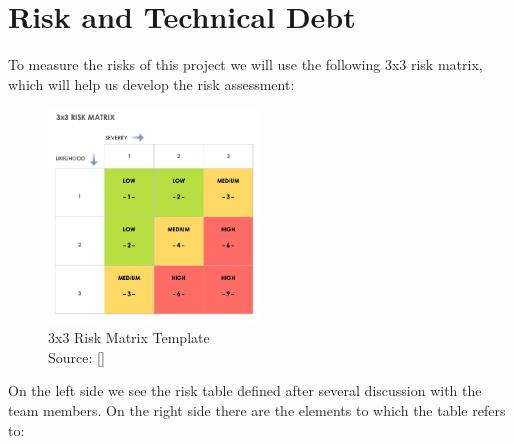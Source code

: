 \section{Risk and Technical Debt}

To measure the risks of this project we will use the following 3x3 risk matrix, which will help us develop the 
\gls{risk assessment}:

\begin{figure}[H]
    \centering
    \includegraphics[width=0.5\textwidth]{assets/Risk-Matrix.png}
    \caption{3x3 Risk Matrix Template\\ Source: [\citet{refonline:smtrisk}]  }
    \label{fig:risk_matrix_template}
\end{figure}

On the left side we see the risk table  defined after several discussion with the team members.
On the right side there are the elements to which the table refers to:

